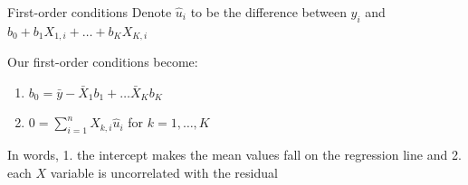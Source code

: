 \documentclass[aspectratio=169,t,11pt,table]{beamer}
\begin{document}
% 

\begin{frame}{First-order conditions}
  Denote $\hat{u}_i$ to be the difference between $y_i$ and $b_0 + b_1 X_{1,i} + \dots + b_K X_{K,i}$

  Our first-order conditions become:
  \begin{enumerate}
    \item $b_0 = \bar{y} - \bar{X}_1 b_1 + \dots \bar{X}_K b_K$
    
    \item $0 = \sum_{i=1}^n X_{k,i} \hat{u}_{i}$ for $k = 1,\dots, K$
  \end{enumerate}

  \bigskip
  In words, 1. the intercept makes the mean values fall on the regression line and 2. each $X$ variable is uncorrelated with the residual
\end{frame}
\end{document}
